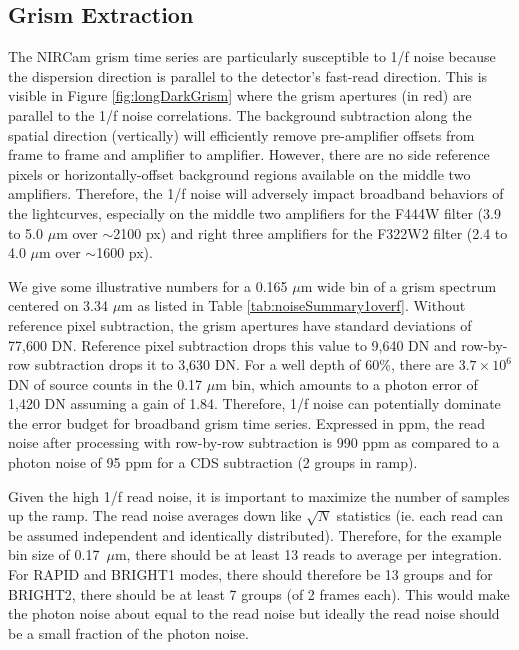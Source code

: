 \documentclass{aastex62}
\begin{document}
\subsection{Grism Extraction}

The NIRCam grism time series are particularly susceptible to 1/f noise because the dispersion direction is parallel to the detector's fast-read direction.
This is visible in Figure \ref{fig:longDarkGrism} where the grism apertures (in red) are parallel to the 1/f noise correlations.
The background subtraction along the spatial direction (vertically) will efficiently remove pre-amplifier offsets from frame to frame and amplifier to amplifier.
However, there are no side reference pixels or horizontally-offset background regions available on the middle two amplifiers.
Therefore, the 1/f noise will adversely impact broadband behaviors of the lightcurves, especially on the middle two amplifiers for the F444W filter (3.9 to 5.0 $\mu$m over $\sim$2100 px) and right three amplifiers for the F322W2 filter (2.4 to 4.0 $\mu$m over $\sim$1600 px).

We give some illustrative numbers for a 0.165 $\mu$m wide bin of a grism spectrum centered on 3.34 $\mu$m as listed in Table \ref{tab:noiseSummary1overf}.
Without reference pixel subtraction, the grism apertures have standard deviations of 77,600 DN.
Reference pixel subtraction drops this value to 9,640 DN and row-by-row subtraction drops it to 3,630 DN.
For a well depth of 60\%, there are $3.7 \times 10^6$ DN of source counts in the 0.17 $\mu$m bin, which amounts to a photon error of 1,420 DN assuming a gain of 1.84.
Therefore, 1/f noise can potentially dominate the error budget for broadband grism time series.
Expressed in ppm, the read noise after processing with row-by-row subtraction is 990 ppm as compared to a photon noise of 95 ppm for a CDS subtraction (2 groups in ramp).

Given the high 1/f read noise, it is important to maximize the number of samples up the ramp.
The read noise averages down like $\sqrt{N}$ statistics (ie. each read can be assumed independent and identically distributed).
Therefore, for the example bin size of 0.17~$\mu$m, there should be at least 13 reads to average per integration.
For RAPID and BRIGHT1 modes, there should therefore be 13 groups and for BRIGHT2, there should be at least 7 groups (of 2 frames each).
This would make the photon noise about equal to the read noise but ideally the read noise should be a small fraction of the photon noise.
\end{document}
